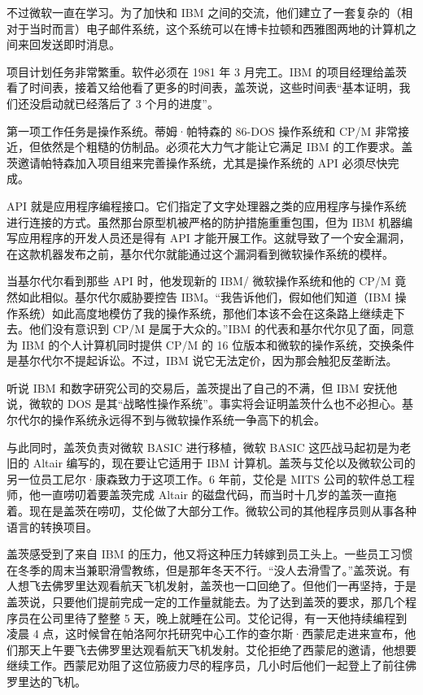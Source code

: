 \documentclass[12pt,UTF8]{ctexbook}
\begin{document}
不过微软一直在学习。为了加快和 IBM 之间的交流，他们建立了一套复杂的（相对于当时而言）电子邮件系统，这个系统可以在博卡拉顿和西雅图两地的计算机之间来回发送即时消息。

项目计划任务非常繁重。软件必须在 1981 年 3 月完工。IBM 的项目经理给盖茨看了时间表，接着又给他看了更多的时间表，盖茨说，这些时间表“基本证明，我们还没启动就已经落后了 3 个月的进度”。

第一项工作任务是操作系统。蒂姆·帕特森的 86-DOS 操作系统和 CP/M 非常接近，但依然是个粗糙的仿制品。必须花大力气才能让它满足 IBM 的工作要求。盖茨邀请帕特森加入项目组来完善操作系统，尤其是操作系统的 API 必须尽快完成。

API 就是应用程序编程接口。它们指定了文字处理器之类的应用程序与操作系统进行连接的方式。虽然那台原型机被严格的防护措施重重包围，但为 IBM 机器编写应用程序的开发人员还是得有 API 才能开展工作。这就导致了一个安全漏洞，在这款机器发布之前，基尔代尔就能通过这个漏洞看到微软操作系统的模样。

当基尔代尔看到那些 API 时，他发现新的 IBM/ 微软操作系统和他的 CP/M 竟然如此相似。基尔代尔威胁要控告 IBM。“我告诉他们，假如他们知道（IBM 操作系统）如此高度地模仿了我的操作系统，那他们本该不会在这条路上继续走下去。他们没有意识到 CP/M 是属于大众的。”IBM 的代表和基尔代尔见了面，同意为 IBM 的个人计算机同时提供 CP/M 的 16 位版本和微软的操作系统，交换条件是基尔代尔不提起诉讼。不过，IBM 说它无法定价，因为那会触犯反垄断法。

听说 IBM 和数字研究公司的交易后，盖茨提出了自己的不满，但 IBM 安抚他说，微软的 DOS 是其“战略性操作系统”。事实将会证明盖茨什么也不必担心。基尔代尔的操作系统永远得不到与微软操作系统一争高下的机会。

与此同时，盖茨负责对微软 BASIC 进行移植，微软 BASIC 这匹战马起初是为老旧的 Altair 编写的，现在要让它适用于 IBM 计算机。盖茨与艾伦以及微软公司的另一位员工尼尔·康森致力于这项工作。6 年前，艾伦是 MITS 公司的软件总工程师，他一直唠叨着要盖茨完成 Altair 的磁盘代码，而当时十几岁的盖茨一直拖着。现在是盖茨在唠叨，艾伦做了大部分工作。微软公司的其他程序员则从事各种语言的转换项目。

盖茨感受到了来自 IBM 的压力，他又将这种压力转嫁到员工头上。一些员工习惯在冬季的周末当兼职滑雪教练，但是那年冬天不行。“没人去滑雪了。”盖茨说。有人想飞去佛罗里达观看航天飞机发射，盖茨也一口回绝了。但他们一再坚持，于是盖茨说，只要他们提前完成一定的工作量就能去。为了达到盖茨的要求，那几个程序员在公司里待了整整 5 天，晚上就睡在公司。艾伦记得，有一天他持续编程到凌晨 4 点，这时候曾在帕洛阿尔托研究中心工作的查尔斯·西蒙尼走进来宣布，他们那天上午要飞去佛罗里达观看航天飞机发射。艾伦拒绝了西蒙尼的邀请，他想要继续工作。西蒙尼劝阻了这位筋疲力尽的程序员，几小时后他们一起登上了前往佛罗里达的飞机。
\end{document}
